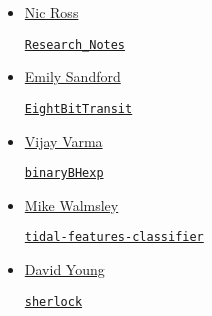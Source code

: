 \documentclass[11pt,a4paper]{article}
\begin{document}
\begin{itemize}
\item \href{https://github.com/d80b2t}{Nic Ross}
  \begin{itemize}
    \href{https://github.com/d80b2t/Research\_Notes}{\tt Research\_Notes}
  \end{itemize}

\item \href{https://github.com/esandford}{Emily Sandford}
  \begin{itemize}
    \href{https://github.com/esandford/EightBitTransit}{\tt EightBitTransit}
  \end{itemize}

\item \href{https://github.com/vijayvarma392}{Vijay Varma}
  \begin{itemize}
    \href{https://github.com/vijayvarma392/binaryBHexp}{\tt binaryBHexp}
  \end{itemize}

\item \href{https://github.com/mwalmsley/}{Mike Walmsley} 
  \begin{itemize}
    \href{https://github.com/mwalmsley/tidal-features-classifier}{\tt tidal-features-classifier} 
\end{itemize}


\item \href{https://github.com/thespacedoctor}{David Young}
  \begin{itemize}
    \href{https://github.com/thespacedoctor/sherlock}{{\tt sherlock}}
  \end{itemize}




\end{itemize}
\end{document}
